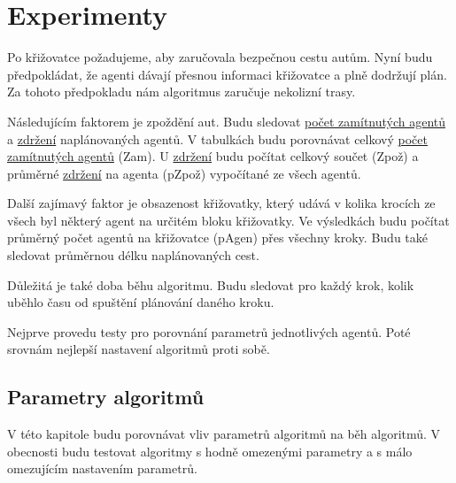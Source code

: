 \chapter{Experimenty}\label{ch:experimenty}


Po křižovatce požadujeme, aby zaručovala bezpečnou cestu autům.
Nyní budu předpokládat, že agenti dávají přesnou informaci křižovatce a plně dodržují plán.
Za tohoto předpokladu nám algoritmus zaručuje nekolizní trasy.

Následujícím faktorem je zpoždění aut.
Budu sledovat \hyperref[par:zamitnuti]{počet zamítnutých agentů} a \hyperref[par:zdrzeni]{zdržení} naplánovaných agentů.
V tabulkách budu porovnávat celkový \hyperref[par:zamitnuti]{počet zamítnutých agentů} (Zam).
U \hyperref[par:zdrzeni]{zdržení} budu počítat celkový součet (Zpož)
a průměrné \hyperref[par:zdrzeni]{zdržení} na agenta (pZpož) vypočítané ze všech agentů.

Další zajímavý faktor je obsazenost křižovatky,
který udává v kolika krocích ze všech byl některý agent na určitém bloku křižovatky.
Ve výsledkách budu počítat průměrný počet agentů na křižovatce (pAgen) přes všechny kroky.
Budu také sledovat průměrnou délku naplánovaných cest.

Důležitá je také doba běhu algoritmu.
Budu sledovat pro každý krok, kolik uběhlo času od spuštění plánování daného kroku.

Nejprve provedu testy pro porovnání parametrů jednotlivých agentů.
Poté srovnám nejlepší nastavení algoritmů proti sobě.





\section{Parametry algoritmů}\label{sec:parametry_algoritmu}

%

V této kapitole budu porovnávat vliv parametrů algoritmů na běh algoritmů.
V obecnosti budu testovat algoritmy s hodně omezenými parametry a s málo omezujícím nastavením parametrů.




